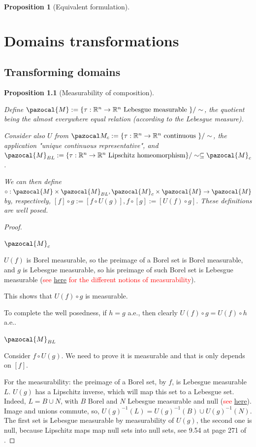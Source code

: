 \documentclass[english,a4paper,9pt,oneside]{scrbook}	%
\theoremstyle{break}
\newtheorem{prop}[equation]{Proposition}
\newenvironment{mproof}[1][\proofname]{%
  \begin{proof}[#1]$ $\par\nobreak\ignorespaces
}{%
  \end{proof}
}
\renewcommand*{\proofname}{Proof}
\theoremstyle{remark}
\newcommand{\mR}{\mathbb{R}}
\begin{document}
\begin{appendices}
\begin{prop}[Equivalent formulation]
\end{prop}

\chapter{Domains transformations}

\section{Transforming domains}

\begin{prop}[Measurability of composition]
\label{prop:circ_wd}

Define $\pazocal{M}:=\{\tau: \mR^n \rightarrow \mR^n \text{ Lebesgue measurable } \}/\sim$, the quotient being the almost everywhere equal relation (according to the Lebesgue measure).

Consider also $U$ from $\pazocal M_c :=\{\tau: \mR^n \rightarrow \mR^n \text{ continuous } \}/\sim$, the application "unique continuous representative", and $\pazocal{M}_{BL} :=\{\tau: \mR^n \rightarrow \mR^n \text{ Lipschitz homeomorphism} \}/\sim \subseteq \pazocal{M}_c$.

We can then define $\circ:  \pazocal{M} \times \pazocal{M}_{BL}, \pazocal{M}_c \times \pazocal{M} \rightarrow \pazocal{M}$ by, respectively, $[f]\circ g := [f\circ U(g)], f \circ [g]:= [U(f)\circ g]$. These definitions are well posed.

\end{prop}
\begin{mproof}

\underline{$\pazocal{M}_c$}

$U(f)$ is Borel measurable, so the preimage of a Borel set is Borel measurable, and $g$ is Lebesgue measurable, so his preimage of such Borel set is Lebesgue measurable (\textcolor{red}{see \href{https://math.stackexchange.com/questions/283443/is-composition-of-measurable-functions-measurable}{here} for the different notions of measurability}).

This shows that $U(f)\circ g$ is measurable.

To complete the well posedness, if $h=g$ a.e., then clearly $U(f)\circ g= U(f)\circ  h$ a.e..

\underline{$\pazocal{M}_{BL}$}

Consider $f\circ U(g)$. We need to prove it is measurable and that is only depends on $[f]$.

For the measurability: the preimage of a Borel set, by $f$, is Lebesgue measurable $L$. $U(g)$ has a Lipschitz inverse, which will map this set to a Lebesgue set. Indeed, $L = B \cup N$, with $B$ Borel and $N$ Lebesgue measurable and null (\textcolor{red}{see \href{https://math.stackexchange.com/questions/3420145/lebesgue-measurable-set-union-of-borel-set-and-null-set}{here}}). Image and unions commute, so, $U(g)^{-1}(L) = U(g)^{-1}(B) \cup U(g)^{-1}(N)$. The first set is Lebesgue measurable by measurability of $U(g)$, the second one is null, because Lipschitz maps map null sets into null sets, see 9.54 at page 271 of \cite{leoni}. 


\end{mproof}
\end{appendices}
\end{document}
